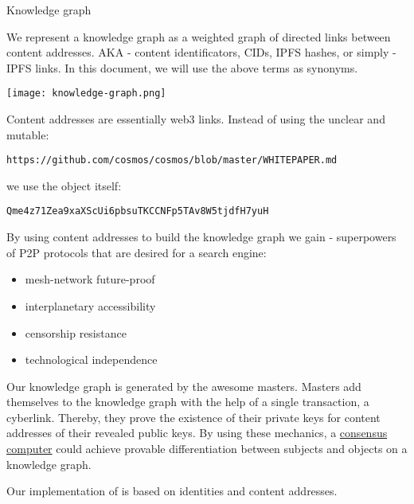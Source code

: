 \documentclass[8pt,oneside]{amsart}
\makeatletter
\newcommand{\linkred}[2]{\href{#1}{\color{red}{#2}}}
\newcommand{\linkgreen}[2]{\href{#1}{\color{green}{#2}}}
\renewcommand\subsection{\@startsection{subsection}
                                    {2}{\z@}
                                    {-3.25ex\@plus -1ex \@minus -.2ex}
                                    {0ex \@plus .2ex}
                                    {\play\Large}
                        }
\newcommand{\titleSection}[1]{\subsection{#1}}
\newenvironment{Figure}
  {\par\medskip\noindent\minipage{\linewidth}}
  {\endminipage\par\medskip}
\makeatother
\begin{document}
\titleSection{Knowledge graph}\label{knowledge-graph}

We represent a knowledge graph as a weighted graph of directed links between content addresses. AKA - content identificators, CIDs, IPFS hashes, or simply - IPFS links. In this document, we will use the above terms as synonyms.

\begin{Figure}
    \centering
    \texttt{[image: knowledge-graph.png]}
\end{Figure}

Content addresses are essentially web3 links. Instead of using the unclear and mutable:
\begin{lstlisting}
https://github.com/cosmos/cosmos/blob/master/WHITEPAPER.md
\end{lstlisting}
we use the object itself:
\begin{lstlisting}
Qme4z71Zea9xaXScUi6pbsuTKCCNFp5TAv8W5tjdfH7yuH
\end{lstlisting}

By using content addresses to build the knowledge graph we gain \linkred{https://steemit.com/web3/@hipster/an-idea-of-decentralized-search-for-web3-ce860d61defe5est}{the so much needed} \linkgreen{https://ipfs.io/ipfs/QmV9tSDx9UiPeWExXEeH6aoDvmihvx6jD5eLb4jbTaKGps}{IPFS} - \linkgreen{https://ipfs.io/ipfs/QmXHGmfo4sjdHVW2MAxczAfs44RCpSeva2an4QvkzqYgfR}{like} superpowers of P2P protocols that are desired for a search engine:

\begin{itemize}
\item mesh-network future-proof
\item interplanetary accessibility
\item censorship resistance
\item technological independence
\end{itemize}

Our knowledge graph is generated by the awesome masters. Masters add themselves to the knowledge graph with the help of a single transaction, a cyberlink. Thereby, they prove the existence of their private keys for content addresses of their revealed public keys. By using these mechanics, a {\hyperref[consensus-computer]{consensus computer}} could achieve provable differentiation between subjects and objects on a knowledge graph.

Our implementation of \linkred{https://github.com/cybercongress/go-cyber}{go-cyber} is based on \linkred{https://github.com/cosmos/cosmos-sdk}{cosmos-SDK} identities and \linkred{https://github.com/multiformats/cid#cidv0}{CIDv0/CIDv1} content addresses.
\end{document}
